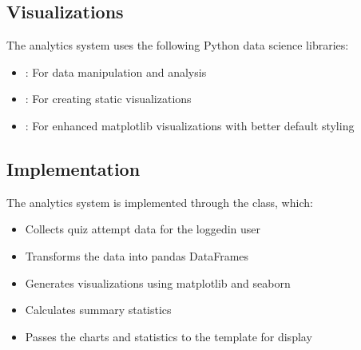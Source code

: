 \documentclass[letterpaper,10pt,english]{sphinxmanual}
\begin{document}
\subsection{Visualizations}
\label{\detokenize{analytics:visualizations}}
\sphinxAtStartPar
The analytics system uses the following Python data science libraries:
\begin{itemize}
\item {} 
\sphinxAtStartPar
{}: For data manipulation and analysis

\item {} 
\sphinxAtStartPar
{}: For creating static visualizations

\item {} 
\sphinxAtStartPar
{}: For enhanced matplotlib visualizations with better default styling

\end{itemize}


\subsection{Implementation}
\label{\detokenize{analytics:implementation}}
\sphinxAtStartPar
The analytics system is implemented through the  class, which:
\begin{itemize}
\item {} 
\sphinxAtStartPar
Collects quiz attempt data for the logged\sphinxhyphen{}in user

\item {} 
\sphinxAtStartPar
Transforms the data into pandas DataFrames

\item {} 
\sphinxAtStartPar
Generates visualizations using matplotlib and seaborn

\item {} 
\sphinxAtStartPar
Calculates summary statistics

\item {} 
\sphinxAtStartPar
Passes the charts and statistics to the template for display

\end{itemize}
\end{document}
